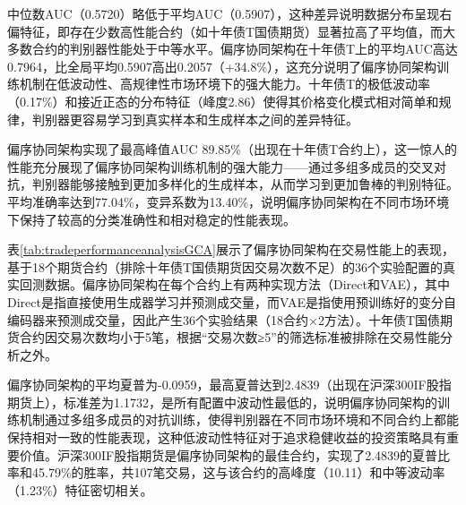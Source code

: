 中位数AUC（0.5720）略低于平均AUC（0.5907），这种差异说明数据分布呈现右偏特征，即存在少数高性能合约（如十年债T国债期货）显著拉高了平均值，而大多数合约的判别器性能处于中等水平。偏序协同架构在十年债T上的平均AUC高达0.7964，比全局平均0.5907高出0.2057（+34.8\%），这充分说明了偏序协同架构训练机制在低波动性、高规律性市场环境下的强大能力。十年债T的极低波动率（0.17\%）和接近正态的分布特征（峰度2.86）使得其价格变化模式相对简单和规律，判别器更容易学习到真实样本和生成样本之间的差异特征。

偏序协同架构实现了最高峰值AUC 89.85\%（出现在十年债T合约上），这一惊人的性能充分展现了偏序协同架构训练机制的强大能力——通过多组多成员的交叉对抗，判别器能够接触到更加多样化的生成样本，从而学习到更加鲁棒的判别特征。平均准确率达到77.04\%，变异系数为13.40\%，说明偏序协同架构在不同市场环境下保持了较高的分类准确性和相对稳定的性能表现。

\begin{table}[htbp]
\centering
\caption{偏序协同架构对交易性能的影响分析}
\label{tab:tradeperformanceanalysisGCA}
\tiny
\setlength{\tabcolsep}{1.5pt}
\renewcommand{\arraystretch}{1.3}
\end{table}

表\ref{tab:tradeperformanceanalysisGCA}展示了偏序协同架构在交易性能上的表现，基于18个期货合约（排除十年债T国债期货因交易次数不足）的36个实验配置的真实回测数据。偏序协同架构在每个合约上有两种实现方法（Direct和VAE），其中Direct是指直接使用生成器学习并预测成交量，而VAE是指使用预训练好的变分自编码器来预测成交量，因此产生36个实验结果（18合约×2方法）。十年债T国债期货合约因交易次数均小于5笔，根据“交易次数≥5”的筛选标准被排除在交易性能分析之外。

偏序协同架构的平均夏普为-0.0959，最高夏普达到2.4839（出现在沪深300IF股指期货上），标准差为1.1732，是所有配置中波动性最低的，说明偏序协同架构的训练机制通过多组多成员的对抗训练，使得判别器在不同市场环境和不同合约上都能保持相对一致的性能表现，这种低波动性特征对于追求稳健收益的投资策略具有重要价值。沪深300IF股指期货是偏序协同架构的最佳合约，实现了2.4839的夏普比率和45.79\%的胜率，共107笔交易，这与该合约的高峰度（10.11）和中等波动率（1.23\%）特征密切相关。

